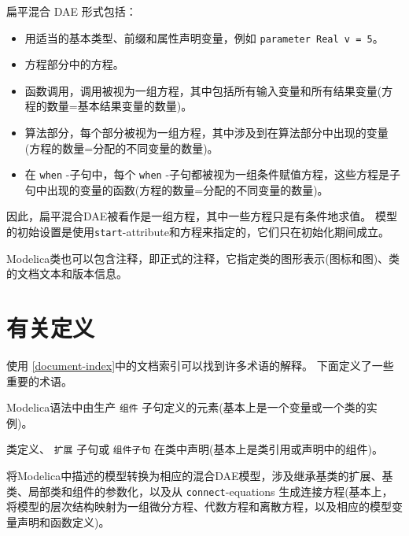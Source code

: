 扁平混合 DAE 形式包括：
\begin{itemize}
\item
  用适当的基本类型、前缀和属性声明变量，例如 \lstinline!parameter Real v = 5!。
\item
  方程部分中的方程。
\item
  函数调用，调用被视为一组方程，其中包括所有输入变量和所有结果变量(方程的数量=基本结果变量的数量)。
\item
  算法部分，每个部分被视为一组方程，其中涉及到在算法部分中出现的变量(方程的数量=分配的不同变量的数量)。
\item
  在 \lstinline!when! -子句中，每个 \lstinline!when! -子句都被视为一组条件赋值方程，这些方程是子句中出现的变量的函数(方程的数量=分配的不同变量的数量)。
\end{itemize}

因此，扁平混合DAE被看作是一组方程，其中一些方程只是有条件地求值。
模型的初始设置是使用\lstinline!start!-attribute和方程来指定的，它们只在初始化期间成立。

Modelica类也可以包含注释，即正式的注释，它指定类的图形表示(图标和图)、类的文档文本和版本信息。

\section{有关定义}\label{some-definitions}

使用 \cref{document-index}中的文档索引可以找到许多术语的解释。
下面定义了一些重要的术语。

\begin{definition}[Component]
Modelica语法中由生产 \lstinline[language=grammar]!组件! 子句定义的元素(基本上是一个变量或一个类的实例)。
\end{definition}

\begin{definition}[Element]
类定义、 \lstinline!扩展! 子句或 \lstinline[language=grammar]!组件子句! 在类中声明(基本上是类引用或声明中的组件)。
\end{definition}

\begin{definition}[Flattening]
将Modelica中描述的模型转换为相应的混合DAE模型，涉及继承基类的扩展、基类、局部类和组件的参数化，以及从 \lstinline!connect!-equations 生成连接方程(基本上，将模型的层次结构映射为一组微分方程、代数方程和离散方程，以及相应的模型变量声明和函数定义)。
\end{definition}


